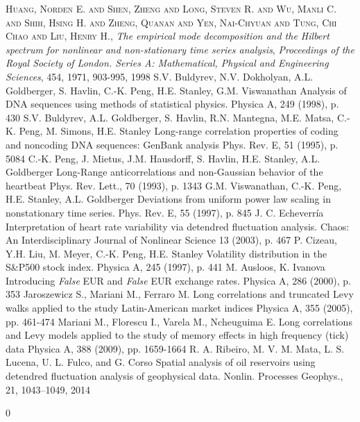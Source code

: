 \documentclass[onecolumn, preprint,aps,amsmath, amssymb, superscriptaddress]{revtex4}
\begin{document}
\begin{thebibliography}{99}
 \textsc{Huang, Norden E.  and Shen, Zheng  and Long, Steven R.  and Wu, Manli C.  and Shih, Hsing H.  and Zheng, Quanan  and Yen, Nai-Chyuan  and Tung, Chi Chao  and Liu, Henry H.}, \textit{The empirical mode decomposition and the Hilbert spectrum for nonlinear and non-stationary time series analysis}, \textit{Proceedings of the Royal Society of London. Series A: Mathematical, Physical and Engineering Sciences}, 454, 1971, 903-995, 1998
S.V. Buldyrev, N.V. Dokholyan, A.L. Goldberger, S. Havlin, C.-K. Peng, H.E. Stanley, G.M. Viswanathan
Analysis of DNA sequences using methods of statistical physics.
Physica A, 249 (1998), p. 430
S.V. Buldyrev, A.L. Goldberger, S. Havlin, R.N. Mantegna, M.E. Matsa, C.-K. Peng, M. Simons, H.E. Stanley
Long-range correlation properties of coding and noncoding DNA sequences: GenBank analysis
Phys. Rev. E, 51 (1995), p. 5084
C.-K. Peng, J. Mietus, J.M. Hausdorff, S. Havlin, H.E. Stanley, A.L. Goldberger
Long-Range anticorrelations and non-Gaussian behavior of the heartbeat
Phys. Rev. Lett., 70 (1993), p. 1343
G.M. Viswanathan, C.-K. Peng, H.E. Stanley, A.L. Goldberger
Deviations from uniform power law scaling in nonstationary time series.
Phys. Rev. E, 55 (1997), p. 845
J. C. Echeverr\'ia
Interpretation of heart rate variability via detendred fluctuation analysis.
Chaos: An Interdisciplinary Journal of Nonlinear Science 13 (2003), p. 467
P. Cizeau, Y.H. Liu, M. Meyer, C.-K. Peng, H.E. Stanley
Volatility distribution in the S\&P500 stock index.
Physica A, 245 (1997), p. 441
M. Ausloos, K. Ivanova
Introducing \textit{False} EUR and \textit{False} EUR exchange rates.
Physica A, 286 (2000), p. 353
Jaroszewicz S., Mariani M., Ferraro M.
Long correlations and truncated Levy walks applied to the study Latin-American market indices
Physica A, 355 (2005), pp. 461-474
Mariani M., Florescu I., Varela M., Ncheuguima E.
Long correlations and Levy models applied to the study of memory effects in high frequency (tick) data
Physica A, 388 (2009), pp. 1659-1664
R. A. Ribeiro, M. V. M. Mata, L. S. Lucena, U. L. Fulco, and G. Corso
Spatial analysis of oil reservoirs using detendred fluctuation analysis of geophysical data.
Nonlin. Processes Geophys., 21, 1043–1049, 2014

\end{thebibliography}0
\end{document}
